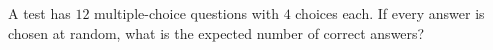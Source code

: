 A test has $12$ multiple-choice questions with $4$ choices each. If every answer is chosen at random, what is the expected number of correct answers?
